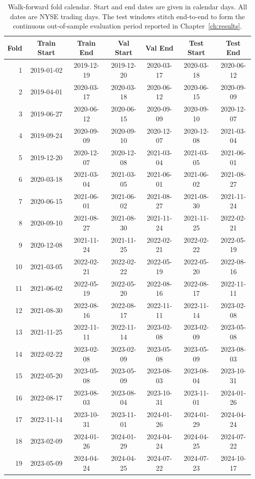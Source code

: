 \begin{table}[htbp]
  \centering
  \small
  \setlength{\tabcolsep}{6pt}
  \caption{Walk-forward fold calendar. Start and end dates are given in
    calendar days. All dates are NYSE trading days. The test windows
    stitch end-to-end to form the continuous out-of-sample evaluation
    period reported in Chapter~\ref{ch:results}.}
  \label{tab:T3_fold_calendar}
  \begin{tabular}{rcccccc}
    \toprule
    \textbf{Fold} & \textbf{Train Start} & \textbf{Train End} & \textbf{Val Start} & \textbf{Val End} & \textbf{Test Start} & \textbf{Test End} \\
    \midrule
    1 & 2019-01-02 & 2019-12-19 & 2019-12-20 & 2020-03-17 & 2020-03-18 & 2020-06-12 \\
    2 & 2019-04-01 & 2020-03-17 & 2020-03-18 & 2020-06-12 & 2020-06-15 & 2020-09-09 \\
    3 & 2019-06-27 & 2020-06-12 & 2020-06-15 & 2020-09-09 & 2020-09-10 & 2020-12-07 \\
    4 & 2019-09-24 & 2020-09-09 & 2020-09-10 & 2020-12-07 & 2020-12-08 & 2021-03-04 \\
    5 & 2019-12-20 & 2020-12-07 & 2020-12-08 & 2021-03-04 & 2021-03-05 & 2021-06-01 \\
    6 & 2020-03-18 & 2021-03-04 & 2021-03-05 & 2021-06-01 & 2021-06-02 & 2021-08-27 \\
    7 & 2020-06-15 & 2021-06-01 & 2021-06-02 & 2021-08-27 & 2021-08-30 & 2021-11-24 \\
    8 & 2020-09-10 & 2021-08-27 & 2021-08-30 & 2021-11-24 & 2021-11-25 & 2022-02-21 \\
    9 & 2020-12-08 & 2021-11-24 & 2021-11-25 & 2022-02-21 & 2022-02-22 & 2022-05-19 \\
    10 & 2021-03-05 & 2022-02-21 & 2022-02-22 & 2022-05-19 & 2022-05-20 & 2022-08-16 \\
    11 & 2021-06-02 & 2022-05-19 & 2022-05-20 & 2022-08-16 & 2022-08-17 & 2022-11-11 \\
    12 & 2021-08-30 & 2022-08-16 & 2022-08-17 & 2022-11-11 & 2022-11-14 & 2023-02-08 \\
    13 & 2021-11-25 & 2022-11-11 & 2022-11-14 & 2023-02-08 & 2023-02-09 & 2023-05-08 \\
    14 & 2022-02-22 & 2023-02-08 & 2023-02-09 & 2023-05-08 & 2023-05-09 & 2023-08-03 \\
    15 & 2022-05-20 & 2023-05-08 & 2023-05-09 & 2023-08-03 & 2023-08-04 & 2023-10-31 \\
    16 & 2022-08-17 & 2023-08-03 & 2023-08-04 & 2023-10-31 & 2023-11-01 & 2024-01-26 \\
    17 & 2022-11-14 & 2023-10-31 & 2023-11-01 & 2024-01-26 & 2024-01-29 & 2024-04-24 \\
    18 & 2023-02-09 & 2024-01-26 & 2024-01-29 & 2024-04-24 & 2024-04-25 & 2024-07-22 \\
    19 & 2023-05-09 & 2024-04-24 & 2024-04-25 & 2024-07-22 & 2024-07-23 & 2024-10-17 \\
    \bottomrule
  \end{tabular}
\end{table}
